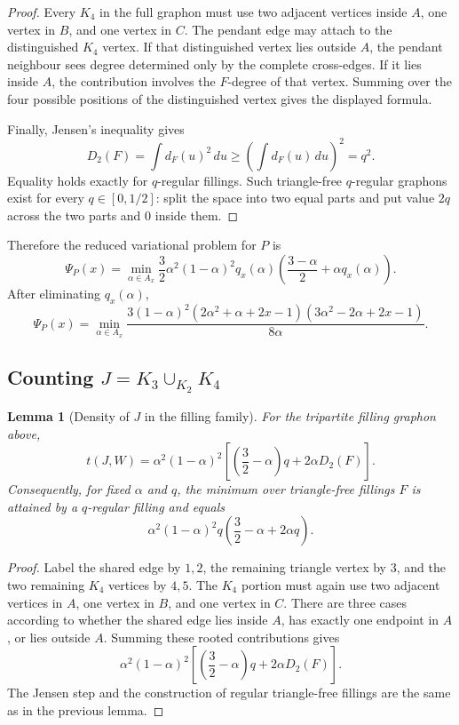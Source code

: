 \documentclass[11pt]{amsart}
\newtheorem{lemma}[theorem]{Lemma}
\theoremstyle{definition}
\newcommand{\1}{\mathbf 1}
\newcommand{\dd}{\,d}
\begin{document}
\begin{proof}
Every $K_4$ in the full graphon must use two adjacent vertices inside $A$, one vertex in $B$, and one vertex in $C$.  The pendant edge may attach to the distinguished $K_4$ vertex.  If that distinguished vertex lies outside $A$, the pendant neighbour sees degree determined only by the complete cross-edges.  If it lies inside $A$, the contribution involves the $F$-degree of that vertex.  Summing over the four possible positions of the distinguished vertex gives the displayed formula.

Finally, Jensen's inequality gives
\[
   D_2(F)=\int d_F(u)^2\dd u\ge \left(\int d_F(u)\dd u\right)^2=q^2.
\]
Equality holds exactly for $q$-regular fillings.  Such triangle-free $q$-regular graphons exist for every $q\in[0,1/2]$: split the space into two equal parts and put value $2q$ across the two parts and $0$ inside them.
\end{proof}

Therefore the reduced variational problem for $P$ is
\[
\boxed{
   \Psi_P(x)=
   \min_{\alpha\in A_x}
   \frac32\alpha^2(1-\alpha)^2q_x(\alpha)
   \left(\frac{3-\alpha}{2}+\alpha q_x(\alpha)\right).
}
\]
After eliminating $q_x(\alpha)$,
\[
\boxed{
   \Psi_P(x)=
   \min_{\alpha\in A_x}
   \frac{3(1-\alpha)^2
     (2\alpha^2+\alpha+2x-1)
     (3\alpha^2-2\alpha+2x-1)}{8\alpha}.
}
\]

\subsection{Counting $J=K_3\cup_{K_2}K_4$}

\begin{lemma}[Density of $J$ in the filling family]
For the tripartite filling graphon above,
\[
   t(J,W)=\alpha^2(1-\alpha)^2
          \left[
             \left(\frac32-\alpha\right)q+2\alpha D_2(F)
          \right].
\]
Consequently, for fixed $\alpha$ and $q$, the minimum over triangle-free fillings $F$ is attained by a $q$-regular filling and equals
\[
   \alpha^2(1-\alpha)^2q
          \left(\frac32-\alpha+2\alpha q\right).
\]
\end{lemma}

\begin{proof}
Label the shared edge by $1,2$, the remaining triangle vertex by $3$, and the two remaining $K_4$ vertices by $4,5$.  The $K_4$ portion must again use two adjacent vertices in $A$, one vertex in $B$, and one vertex in $C$.  There are three cases according to whether the shared edge lies inside $A$, has exactly one endpoint in $A$, or lies outside $A$.  Summing these rooted contributions gives
\[
   \alpha^2(1-\alpha)^2
          \left[
             \left(\frac32-\alpha\right)q+2\alpha D_2(F)
          \right].
\]
The Jensen step and the construction of regular triangle-free fillings are the same as in the previous lemma.
\end{proof}
\end{document}

